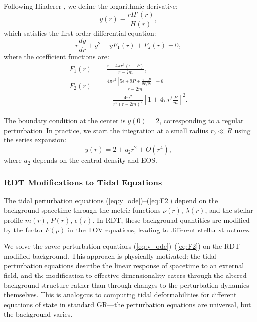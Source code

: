 \documentclass[twocolumn,showpacs,preprintnumbers,amsmath,amssymb,prd]{revtex4-2}
\begin{document}
Following Hinderer \cite{Hinderer2008}, we define the logarithmic derivative:
\begin{equation}
y(r) \equiv \frac{r H'(r)}{H(r)},
\label{eq:y_definition}
\end{equation}
which satisfies the first-order differential equation:
\begin{equation}
r \frac{dy}{dr} + y^2 + yF_1(r) + F_2(r) = 0,
\label{eq:y_ode}
\end{equation}
where the coefficient functions are:
\begin{align}
F_1(r) &= \frac{r - 4\pi r^3(\epsilon - P)}{r - 2m}, \label{eq:F1} \\
F_2(r) &= \frac{4\pi r^2 \left[5\epsilon + 9P + \frac{\epsilon + P}{\partial P/\partial \epsilon}\right] - 6}{r - 2m} \nonumber \\
&\quad - \frac{4m^2}{r^2(r-2m)^2}\left[1 + 4\pi r^3 \frac{P}{m}\right]^2. \label{eq:F2}
\end{align}

The boundary condition at the center is $y(0) = 2$, corresponding to a regular perturbation. In practice, we start the integration at a small radius $r_0 \ll R$ using the series expansion:
\begin{equation}
y(r) = 2 + a_2 r^2 + O(r^4),
\end{equation}
where $a_2$ depends on the central density and EOS.

\subsubsection{RDT Modifications to Tidal Equations}

The tidal perturbation equations (\ref{eq:y_ode})--(\ref{eq:F2}) depend on the background spacetime through the metric functions $\nu(r)$, $\lambda(r)$, and the stellar profile $m(r)$, $P(r)$, $\epsilon(r)$. In RDT, these background quantities are modified by the factor $F(\rho)$ in the TOV equations, leading to different stellar structures.

We solve the \textit{same} perturbation equations (\ref{eq:y_ode})--(\ref{eq:F2}) on the RDT-modified background. This approach is physically motivated: the tidal perturbation equations describe the linear response of spacetime to an external field, and the modification to effective dimensionality enters through the altered background structure rather than through changes to the perturbation dynamics themselves. This is analogous to computing tidal deformabilities for different equations of state in standard GR---the perturbation equations are universal, but the background varies.
\end{document}
